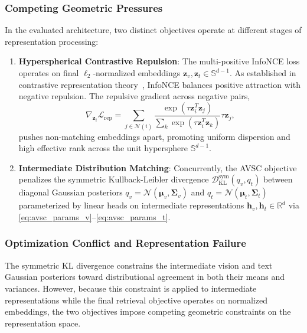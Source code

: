 \documentclass[conference]{IEEEtran}
\begin{document}
\subsubsection{Competing Geometric Pressures}
In the evaluated architecture, two distinct objectives operate at different stages of representation processing:
\begin{enumerate}
    \item \textbf{Hyperspherical Contrastive Repulsion}: The multi-positive InfoNCE loss operates on final $\ell_2$-normalized embeddings $\mathbf{z}_v, \mathbf{z}_t \in \mathbb{S}^{d-1}$. As established in contrastive representation theory~\cite{wang2020understanding,chen2020simple}, InfoNCE balances positive attraction with negative repulsion. The repulsive gradient across negative pairs,
    \begin{equation}
    \label{eq:repulsive_grad}
    \nabla_{\mathbf{z}_i} \mathcal{L}_{\mathrm{rep}} = \sum_{j \in \mathcal{N}(i)} \frac{\exp(\tau \mathbf{z}_i^T \mathbf{z}_j)}{\sum_k \exp(\tau \mathbf{z}_i^T \mathbf{z}_k)} \tau \mathbf{z}_j,
    \end{equation}
    pushes non-matching embeddings apart, promoting uniform dispersion and high effective rank across the unit hypersphere $\mathbb{S}^{d-1}$.
    \item \textbf{Intermediate Distribution Matching}: Concurrently, the AVSC objective penalizes the symmetric Kullback-Leibler divergence $\mathcal{D}_{\mathrm{KL}}^{\mathrm{sym}}(q_v, q_t)$ between diagonal Gaussian posteriors $q_v = \mathcal{N}(\boldsymbol{\mu}_v, \boldsymbol{\Sigma}_v)$ and $q_t = \mathcal{N}(\boldsymbol{\mu}_t, \boldsymbol{\Sigma}_t)$ parameterized by linear heads on intermediate representations $\mathbf{h}_v, \mathbf{h}_t \in \mathbb{R}^d$ via \eqref{eq:avsc_params_v}--\eqref{eq:avsc_params_t}.
\end{enumerate}

\subsubsection{Optimization Conflict and Representation Failure}
The symmetric KL divergence constrains the intermediate vision and text Gaussian posteriors toward distributional agreement in both their means and variances. However, because this constraint is applied to intermediate representations while the final retrieval objective operates on normalized embeddings, the two objectives impose competing geometric constraints on the representation space.
\end{document}

